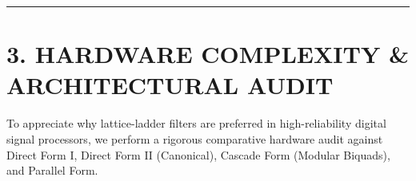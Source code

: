 \documentclass[11pt,a4paper]{article}
\begin{document}
\noindent\rule{\textwidth}{0.5pt}

\section{3. HARDWARE COMPLEXITY \& ARCHITECTURAL AUDIT}

To appreciate why lattice-ladder filters are preferred in high-reliability digital signal processors, we perform a rigorous comparative hardware audit against Direct Form I, Direct Form II (Canonical), Cascade Form (Modular Biquads), and Parallel Form.

\begin{table}[H]
\centering
\caption{Comprehensive Hardware Resource and Performance Comparison ($N$-th Order IIR Filter, $M = N$)}
\label{tab:hardware_comparison}
\vspace{2mm}
\end{table}
\end{document}
